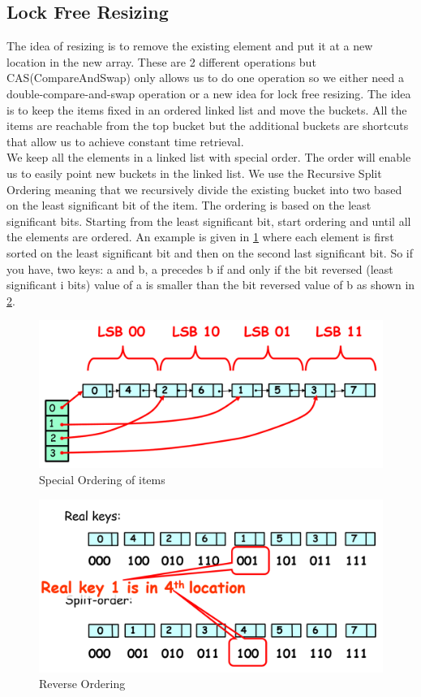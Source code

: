 \documentclass[twoside]{article}
\begin{document}
\subsection{Lock Free Resizing}
The idea of resizing is to remove the existing element and put it at a new location in the new array. These are 2 different operations but CAS(CompareAndSwap) only allows us to do one operation so we either need a double-compare-and-swap operation or a new idea for lock free resizing. The idea is to keep the items fixed in an ordered linked list and move the buckets. All the items are reachable from the top bucket but the additional buckets are shortcuts that allow us to achieve constant time retrieval.\\
We keep all the elements in a linked list with special order. The order will enable us to easily point new buckets in the linked list. We use the Recursive Split Ordering meaning that we recursively divide the existing bucket into two based on the least significant bit of the item. The ordering is based on the least significant bits. Starting from the least significant bit, start ordering and until all the elements are ordered. An example is given in \ref{fig:2} where each element is first sorted on the least significant bit and then on the second last significant bit. So if you have, two keys: a and b, a precedes b if and only if the bit reversed (least significant i bits) value of a is smaller than the bit reversed value of b as shown in \ref{fig:3}. 
\begin{figure}[h]
\centering
\includegraphics[scale=0.25]{ordering}
\caption{Special Ordering of items}
\label{fig:2}
\end{figure}

\begin{figure}[h]
\centering
\includegraphics[scale=0.25]{mapping}
\caption{Reverse Ordering}
\label{fig:3}
\end{figure}
\end{document}
